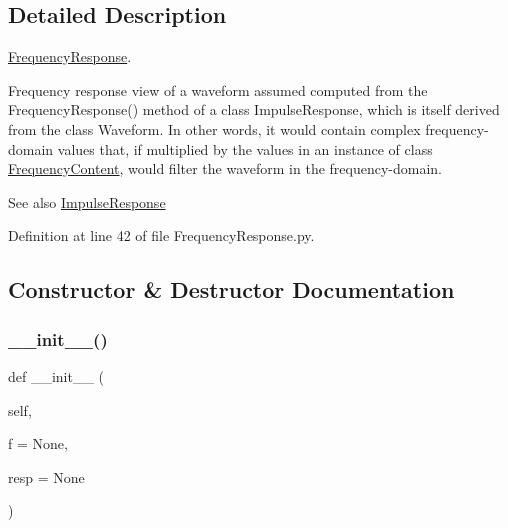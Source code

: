 \subsection{Detailed Description}
\hyperlink{classSignalIntegrity_1_1FrequencyDomain_1_1FrequencyResponse_1_1FrequencyResponse}{Frequency\+Response}. 

Frequency response view of a waveform assumed computed from the Frequency\+Response() method of a class Impulse\+Response, which is itself derived from the class Waveform. In other words, it would contain complex frequency-\/domain values that, if multiplied by the values in an instance of class \hyperlink{namespaceSignalIntegrity_1_1FrequencyDomain_1_1FrequencyContent}{Frequency\+Content}, would filter the waveform in the frequency-\/domain. \begin{DoxySeeAlso}{See also}
\hyperlink{classSignalIntegrity_1_1FrequencyDomain_1_1FrequencyResponse_1_1FrequencyResponse_aa301152e06c3881589eb5c70d53734f6}{Impulse\+Response} 
\end{DoxySeeAlso}


Definition at line 42 of file Frequency\+Response.\+py.



\subsection{Constructor \& Destructor Documentation}
\mbox{\label{classSignalIntegrity_1_1FrequencyDomain_1_1FrequencyResponse_1_1FrequencyResponse_af89c1b84b55a8388acf19c91be67a97e}} 
\subsubsection{\texorpdfstring{\+\_\+\+\_\+init\+\_\+\+\_\+()}{\_\_init\_\_()}}
{\footnotesize\ttfamily def \+\_\+\+\_\+init\+\_\+\+\_\+ (\begin{DoxyParamCaption}\item[{}]{self,  }\item[{}]{f = {\ttfamily None},  }\item[{}]{resp = {\ttfamily None} }\end{DoxyParamCaption})}



